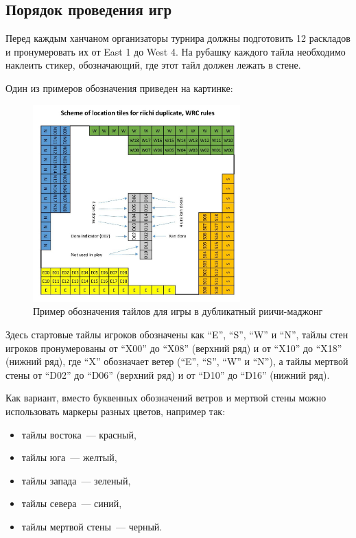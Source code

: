 \begin{additional}
\subsection{Порядок проведения игр}

Перед каждым ханчаном организаторы турнира должны подготовить 12 раскладов и пронумеровать их от East 1 до West 4. На рубашку каждого тайла необходимо наклеить стикер, обозначающий, где этот тайл должен лежать в стене.

Один из примеров обозначения приведен на картинке:

\begin{figure}[H]
	\centering
	\includegraphics[width=8cm]{img/duplicate_marks.jpg}
	\caption{Пример обозначения тайлов для игры в дубликатный риичи-маджонг}
\end{figure}

Здесь стартовые тайлы игроков обозначены как ``E'', ``S'', ``W'' и ``N'', тайлы стен игроков пронумерованы от ``X00'' до ``X08'' (верхний ряд) и от ``X10'' до ``X18'' (нижний ряд), где ``X'' обозначает ветер (``E'', ``S'', ``W'' и ``N''), а тайлы мертвой стены от ``D02'' до ``D06'' (верхний ряд) и от ``D10'' до ``D16'' (нижний ряд).

\vspace{0.3cm}

Как вариант, вместо буквенных обозначений ветров и мертвой стены можно использовать маркеры разных цветов, например так:

\begin{itemize}
	\item тайлы востока~--- красный,
	\item тайлы юга~--- желтый,
	\item тайлы запада~--- зеленый,
	\item тайлы севера~--- синий,
	\item тайлы мертвой стены~--- черный.
\end{itemize}


\end{additional}
